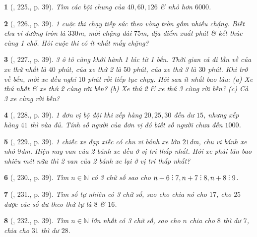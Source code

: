 \documentclass{article}
\newtheorem{baitoan}{}
\DeclareRobustCommand{\divby}{%
	\mathrel{\vbox{\baselineskip.65ex\lineskiplimit0pt\hbox{.}\hbox{.}\hbox{.}}}%
}
\begin{document}
\begin{baitoan}[\cite{Binh_Toan_6_tap_1}, 225., p. 39]
	Tìm các bội chung của $40,60,126$ \& nhỏ hơn $6000$.
\end{baitoan}

\begin{baitoan}[\cite{Binh_Toan_6_tap_1}, 226., p. 39]
	1 cuộc thi chạy tiếp sức theo vòng tròn gồm nhiều chặng. Biết chu vi đường tròn là $330$\emph{m}, mỗi chặng dài $75$\emph{m}, địa điểm xuất phát \& kết thúc cùng 1 chỗ. Hỏi cuộc thi có ít nhất mấy chặng?
\end{baitoan}

\begin{baitoan}[\cite{Binh_Toan_6_tap_1}, 227., p. 39]
	3 ô tô cùng khởi hành 1 lúc từ 1 bến. Thời gian cả đi lẫn về của xe thứ nhất là $40$ phút, của xe thứ 2 là $50$ phút, của xe thứ 3 là $30$ phút. Khi trở về bến, mỗi xe đều nghỉ $10$ phút rồi tiếp tục chạy. Hỏi sau ít nhất bao lâu: (a) Xe thứ nhất \& xe thứ 2 cùng rời bến? (b) Xe thứ 2 \& xe thứ 3 cùng rời bến? (c) Cả 3 xe cùng rời bến?
\end{baitoan}

\begin{baitoan}[\cite{Binh_Toan_6_tap_1}, 228., p. 39]
	1 đơn vị bộ đội khi xếp hàng $20,25,30$ đều dư $15$, nhưng xếp hàng $41$ thì vừa đủ. Tính số người của đơn vị đó biết số người chưa đến $1000$.
\end{baitoan}

\begin{baitoan}[\cite{Binh_Toan_6_tap_1}, 229., p. 39]
	1 chiếc xe đạp xiếc có chu vi bánh xe lớn $21$\emph{dm}, chu vi bánh xe nhỏ $9$\emph{dm}. Hiện nay van của 2 bánh xe đều ở vị trí thấp nhất. Hỏi xe phải lăn bao nhiêu mét nữa thì 2 van của 2 bánh xe lại ở vị trí thấp nhất?
\end{baitoan}

\begin{baitoan}[\cite{Binh_Toan_6_tap_1}, 230., p. 39]
	Tìm $n\in\mathbb{N}$ có 3 chữ số sao cho $n + 6\divby7,n + 7\divby8,n + 8\divby9$.
\end{baitoan}

\begin{baitoan}[\cite{Binh_Toan_6_tap_1}, 231., p. 39]
	Tìm số tự nhiên có 3 chữ số, sao cho chia nó cho $17$, cho $25$ được các số dư theo thứ tự là $8$ \& $16$.
\end{baitoan}

\begin{baitoan}[\cite{Binh_Toan_6_tap_1}, 232., p. 39]
	Tìm $n\in\mathbb{N}$ lớn nhất có 3 chữ số, sao cho $n$ chia cho $8$ thì dư $7$, chia cho $31$ thì dư $28$.
\end{baitoan}
\end{document}
